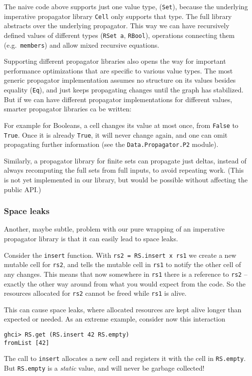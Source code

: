 \documentclass[manuscript,screen,acmsmall]{acmart}
\begin{document}
The naive code above supports just one value type, (\verb|Set|), because the underlying imperative propagator library \verb|Cell| only supports that type. The full library abstracts over the underlying propagator. This way we can have recursively defined values of different types (\verb|RSet a|, \verb|RBool|), operations connecting them (e.g.\ \verb|members|) and allow mixed recursive equations.

Supporting different propagator libraries also opens the way for important performance optimizations that are specific to various value types. The most generic propagator implementation assumes no structure on its values besides equality (\verb|Eq|), and just keeps propagating changes until the graph has stabilized. But if we can have different propagator implementations for different values, smarter propagator libraries ca be written:

For example for Booleans, a cell changes its value at most once, from \verb|False| to \verb|True|. Once it is already \verb|True|, it will never change again, and one can omit propagating further information (see the \verb|Data.Propagator.P2| module).

Similarly, a propagator library for finite sets can propagate just deltas, instead of always recomputing the full sets from full inputs, to avoid repeating work. (This is not yet implemented in our library, but would be possible without affecting the public API.)

\subsubsection{Space leaks}\label{sec:spaceleak}

Another, maybe subtle, problem with our pure wrapping of an imperative propagator library is that it can easily lead to space leaks.

Consider the \verb|insert| function. With \verb|rs2 = RS.insert x rs1| we create a new mutable cell for \verb|rs2|, and tells the mutable cell in \verb|rs1| to notify the other cell of any changes. This means that now somewhere in \verb|rs1| there is a reference to \verb|rs2| -- exactly the other way around from what you would expect from the code. So the resources allocated for \verb|rs2| cannot be freed while \verb|rs1| is alive.

This can cause space leaks, where allocated resources are kept alive longer than expected or needed. As an extreme example, consider now this interaction
\begin{verbatim}
ghci> RS.get (RS.insert 42 RS.empty)
fromList [42]
\end{verbatim}
The call to \verb|insert| allocates a new cell and registers it with the cell in \verb|RS.empty|. But \verb|RS.empty| is a \emph{static} value, and will never be garbage collected!
\end{document}
